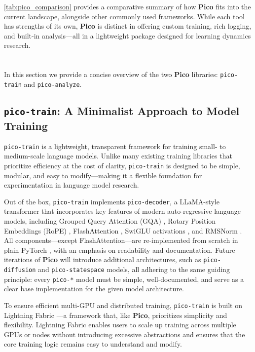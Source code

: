 \cref{tab:pico_comparison} provides a comparative summary of how \textbf{Pico} fits into the current landscape, alongside other commonly used frameworks. While each tool has strengths of its own, \textbf{Pico} is distinct in offering custom training, rich logging, and built-in analysis—all in a lightweight package designed for learning dynamics research.

\section[\picomed]{\picolarge}

In this section we provide a concise overview of the two \textbf{Pico} libraries: \texttt{pico-train} and \texttt{pico-analyze}. 

\subsection{\texttt{pico-train}: A Minimalist Approach to Model Training}

\texttt{pico-train} is a lightweight, transparent framework for training small- to medium-scale language models. Unlike many existing training libraries that prioritize efficiency at the cost of clarity, \texttt{pico-train} is designed to be simple, modular, and easy to modify—making it a flexible foundation for experimentation in language model research.

Out of the box, \texttt{pico-train} implements \texttt{pico-decoder}, a LLaMA-style transformer \citep{touvron2023llama} that incorporates key features of modern auto-regressive language models, including Grouped Query Attention (GQA) \citep{ainslie2023gqa}, Rotary Position Embeddings (RoPE) \citep{su2024rope}, FlashAttention \citep{dao2022flashattention}, SwiGLU activations \citep{shazeer2020glu}, and RMSNorm \citep{zhang2019rmsnorm}. All components—except FlashAttention—are re-implemented from scratch in plain PyTorch \citep{paszke2017pytorch}, with an emphasis on readability and documentation. Future iterations of \textbf{Pico} will introduce additional architectures, such as \texttt{pico-diffusion} and \texttt{pico-statespace} models, all adhering to the same guiding principle: every \texttt{pico-*} model must be simple, well-documented, and serve as a clear base implementation for the given model architecture.

To ensure efficient multi-GPU and distributed training, \texttt{pico-train} is built on Lightning Fabric \citep{lightning-fabric}—a framework that, like \textbf{Pico}, prioritizes simplicity and flexibility. Lightning Fabric enables users to scale up training across multiple GPUs or nodes without introducing excessive abstractions and ensures that the core training logic remains easy to understand and modify.

